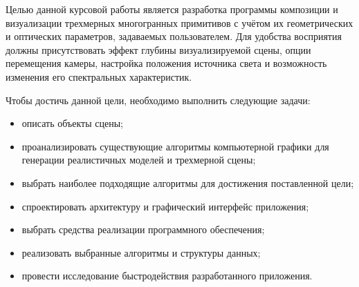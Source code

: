 
Целью данной курсовой работы является разработка программы композиции и визуализации трехмерных многогранных примитивов с учётом их геометрических и оптических параметров, задаваемых пользователем. Для удобства восприятия должны присутствовать эффект глубины визуализируемой сцены, опции перемещения камеры, настройка положения источника света и возможность изменения его спектральных характеристик.

Чтобы достичь данной цели, необходимо выполнить следующие задачи:
\begin{itemize}[label=--]
	\item описать объекты сцены;
	\item проанализировать существующие алгоритмы компьютерной графики для генерации реалистичных моделей и трехмерной сцены;
	\item выбрать наиболее подходящие алгоритмы для достижения поставленной цели;
	\item спроектировать архитектуру и графический интерфейс приложения;
	\item выбрать средства реализации программного обеспечения;
	\item реализовать выбранные алгоритмы и структуры данных;
	\item провести исследование быстродействия разработанного приложения.
\end{itemize}

\clearpage
